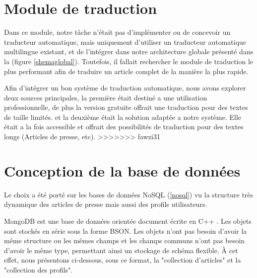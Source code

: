             
            


\section{Module de traduction}
Dans ce module, notre tâche n'était pas d'implémenter ou de concevoir un traducteur automatique, mais uniquement d'utiliser un traducteur automatique multilingue existant, et de l'intégrer dans notre architecture globale présenté dans la (figure \ref{shemaglobal}). 
Toutefois, il fallait rechercher le module de traduction le plus performant afin de traduire un article complet de la manière la plus rapide.

Afin d'intégrer un bon système de traduction automatique, nous avons explorer deux sources principales, la première était destiné a une utilisation professionnelle, de plus la version gratuite offrait une traduction pour des textes de taille limités. et la deuxième était la solution adaptée a notre système. Elle était a la fois accessible et offrait des possibilités de traduction pour des textes longs (Articles de presse, etc). 
>>>>>>> fawzi31



\section{Conception de la base de données}
Le choix a été porté sur les bases de données NoSQL (\autoref{nosql}) vu la structure très dynamique des articles de presse mais aussi des profils utilisateurs.

MongoDB est une base de données orientée document écrite en C++ \cite{NOSQL3}. Les objets sont stockés en série sous la forme BSON.
Les objets n'ont pas besoin d'avoir la même structure ou les mêmes champs et les champs communs n'ont pas besoin d'avoir le même type, permettant ainsi un stockage de schéma flexible. À cet effet, nous présentons ci-dessous, sous ce format, la "collection d'articles" et la "collection des profils".

